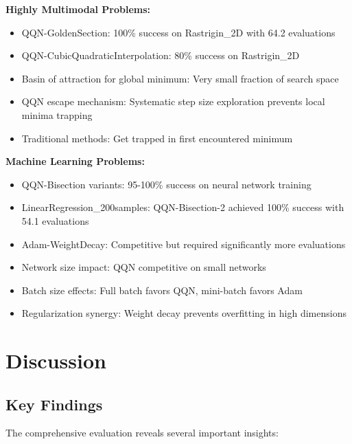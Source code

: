 \textbf{Highly Multimodal Problems:}

\begin{itemize}
\tightlist
\item
  QQN-GoldenSection: 100\% success on Rastrigin\_2D with 64.2 evaluations
\item
  QQN-CubicQuadraticInterpolation: 80\% success on Rastrigin\_2D
\item
  Basin of attraction for global minimum: Very small fraction of search space
\item
  QQN escape mechanism: Systematic step size exploration prevents local minima trapping
\item
  Traditional methods: Get trapped in first encountered minimum
\end{itemize}

\textbf{Machine Learning Problems:}

\begin{itemize}
\tightlist
\item
  QQN-Bisection variants: 95-100\% success on neural network training
\item
  LinearRegression\_200samples: QQN-Bisection-2 achieved 100\% success with 54.1 evaluations
\item
  Adam-WeightDecay: Competitive but required significantly more evaluations
\item
  Network size impact: QQN competitive on small networks
\item
  Batch size effects: Full batch favors QQN, mini-batch favors Adam
\item
  Regularization synergy: Weight decay prevents overfitting in high dimensions
\end{itemize}

\hypertarget{discussion}{%
\section{Discussion}\label{discussion}}

\hypertarget{key-findings}{%
\subsection{Key Findings}\label{key-findings}}

The comprehensive evaluation reveals several important insights:

